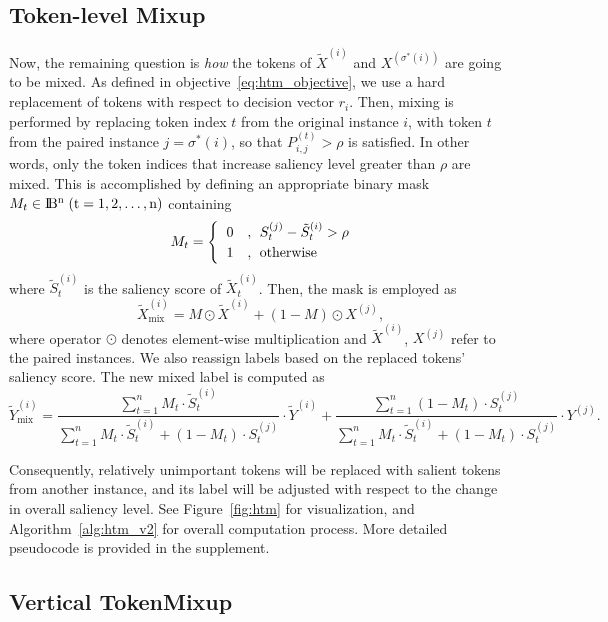 \documentclass{article}
\begin{document}
\subsection{Token-level Mixup}
Now, the remaining question is \textit{how} the tokens of $\tilde{X}^{(i)}$ and $X^{(\sigma^*(i))}$ are going to be mixed.
As defined in objective~\eqref{eq:htm_objective}, we use a hard replacement of tokens with respect to decision vector $r_i$.
Then, mixing is performed by replacing token index $t$ from the original instance $i$, with token $t$ from the paired instance $j=\sigma^*(i)$, so that $P_{i,j}^{(t)} > \rho$ is satisfied.
In other words, only the token indices that increase saliency level greater than $\rho$ are mixed.
This is accomplished by defining an appropriate binary mask $M_t \in \rm I\!B^n \; (t=1,2,\ldots,n)$ containing
\begin{equation}
\label{eq:mask}
    M_t = 
    \begin{cases}
    \hspace{2mm}0  & ,\:\: S_t^{(j)} - \tilde{S}_t^{(i)} > \rho \\
    \hspace{2mm}1  & ,\:\: \textrm{otherwise}
    \end{cases}
\end{equation}
where $\tilde{S}_t^{(i)}$ is the saliency score of $\tilde{X}^{(i)}_t$.
Then, the mask is employed as 
\begin{equation}
\label{eq:mix_x}
    \tilde{X}^{(i)}_{\textrm{mix}} = M \odot \tilde{X}^{(i)} + (1-M) \odot X^{(j)},
\end{equation}
where operator $\odot$ denotes element-wise multiplication and $\tilde{X}^{(i)}$, $X^{(j)}$ refer to the paired instances.
We also reassign labels based on the replaced tokens' saliency score.
The new mixed label is computed as
\begin{equation}
\label{eq:mix_y}
    \tilde{Y}_{\textrm{mix}}^{(i)} = \frac{\sum_{t=1}^n M_t \cdot \tilde{S}_t^{(i)}}{\sum_{t=1}^n M_t \cdot \tilde{S}_t^{(i)} + (1-M_t) \cdot S_t^{(j)}} \cdot \tilde{Y}^{(i)} + \frac{\sum_{t=1}^n (1-M_t) \cdot S_t^{(j)}}{\sum_{t=1}^n M_t \cdot \tilde{S}_t^{(i)} + (1-M_t) \cdot S_t^{(j)}} \cdot Y^{(j)}.
\end{equation}

Consequently, relatively unimportant tokens will be replaced with salient tokens from another instance, and its label will be adjusted with respect to the change in overall saliency level. 
See Figure~\ref{fig:htm} for visualization, and Algorithm~\ref{alg:htm_v2} for overall computation process. 
More detailed pseudocode is provided in the supplement. \subsection{Vertical TokenMixup}
\end{document}
